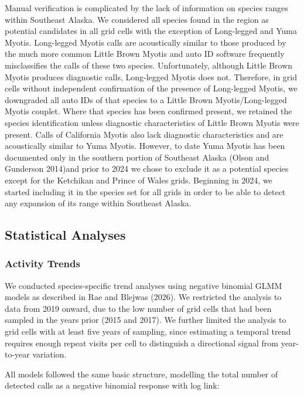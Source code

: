 \documentclass[
  letterpaper,
  DIV=11,
  numbers=noendperiod]{scrartcl}
\begin{document}
Manual verification is complicated by the lack of information on species
ranges within Southeast Alaska. We considered all species found in the
region as potential candidates in all grid cells with the exception of
Long-legged and Yuma Myotis. Long-legged Myotis calls are acoustically
similar to those produced by the much more common Little Brown Myotis
and auto ID software frequently misclassifies the calls of these two
species. Unfortunately, although Little Brown Myotis produces diagnostic
calls, Long-legged Myotis does not. Therefore, in grid cells without
independent confirmation of the presence of Long-legged Myotis, we
downgraded all auto IDs of that species to a Little Brown
Myotis/Long-legged Myotis couplet. Where that species has been confirmed
present, we retained the species identification unless diagnostic
characteristics of Little Brown Myotis were present. Calls of California
Myotis also lack diagnostic characteristics and are acoustically similar
to Yuma Myotis. However, to date Yuma Myotis has been documented only in
the southern portion of Southeast Alaska (Olson and Gunderson 2014)and
prior to 2024 we chose to exclude it as a potential species except for
the Ketchikan and Prince of Wales grids. Beginning in 2024, we started
including it in the species set for all grids in order to be able to
detect any expansion of its range within Southeast Alaska.

\subsection{Statistical Analyses}\label{statistical-analyses}

\subsubsection{Activity Trends}\label{activity-trends}

We conducted species-specific trend analyses using negative binomial
GLMM models as described in Rae and Blejwas (2026). We restricted the
analysis to data from 2019 onward, due to the low number of grid cells
that had been sampled in the years prior (2015 and 2017). We further
limited the analysis to grid cells with at least five years of sampling,
since estimating a temporal trend requires enough repeat visits per cell
to distinguish a directional signal from year-to-year variation.

All models followed the same basic structure, modelling the total number
of detected calls as a negative binomial response with log link:
\end{document}
